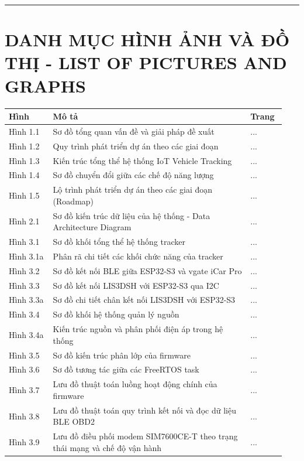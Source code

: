 \documentclass[13pt,a4paper]{extarticle}
\newcounter{none} %
\newcommand{\thesislongtableorignewline}{}
\let\thesislongtableorignewline\\
\renewcommand{\\}{\thesislongtableorignewline\hline}%
\let\\\thesislongtableorignewline
\newcommand{\majorheading}[1]{\clearpage\section*{#1}}
\begin{document}
\begin{center}\rule{0.5\linewidth}{0.5pt}\end{center}

\majorheading{DANH MỤC HÌNH ẢNH VÀ ĐỒ THỊ - LIST OF PICTURES AND GRAPHS}\label{danh-mux1ee5c-huxecnh-ux1ea3nh-vuxe0-ux111ux1ed3-thux1ecb---list-of-pictures-and-graphs}

{\def\LTcaptype{none} %
\begin{longtable}{|C{0.15\linewidth}|L{0.67\linewidth}|C{0.12\linewidth}|}
\hline \textbf{} \textbf{Hình} & \textbf{Mô tả} & \textbf{Trang} \\
\hline
\endhead
\hline
\endlastfoot
Hình 1.1 & Sơ đồ tổng quan vấn đề và giải pháp đề xuất & ... \\
Hình 1.2 & Quy trình phát triển dự án theo các giai đoạn & ... \\
Hình 1.3 & Kiến trúc tổng thể hệ thống IoT Vehicle Tracking & ... \\
Hình 1.4 & Sơ đồ chuyển đổi giữa các chế độ năng lượng & ... \\
Hình 1.5 & Lộ trình phát triển dự án theo các giai đoạn (Roadmap) &
... \\
Hình 2.1 & Sơ đồ kiến trúc dữ liệu của hệ thống - Data Architecture
Diagram & ... \\
Hình 3.1 & Sơ đồ khối tổng thể hệ thống tracker & ... \\
Hình 3.1a & Phân rã chi tiết các khối chức năng của tracker & ... \\
Hình 3.2 & Sơ đồ kết nối BLE giữa ESP32-S3 và vgate iCar Pro & ... \\
Hình 3.3 & Sơ đồ kết nối LIS3DSH với ESP32-S3 qua I2C & ... \\
Hình 3.3a & Sơ đồ chi tiết chân kết nối LIS3DSH với ESP32-S3 & ... \\
Hình 3.4 & Sơ đồ khối hệ thống quản lý nguồn & ... \\
Hình 3.4a & Kiến trúc nguồn và phân phối điện áp trong hệ thống & ... \\
Hình 3.5 & Sơ đồ kiến trúc phân lớp của firmware & ... \\
Hình 3.6 & Sơ đồ tương tác giữa các FreeRTOS task & ... \\
Hình 3.7 & Lưu đồ thuật toán luồng hoạt động chính của firmware & ... \\
Hình 3.8 & Lưu đồ thuật toán quy trình kết nối và đọc dữ liệu BLE OBD2 &
... \\
Hình 3.9 & Lưu đồ điều phối modem SIM7600CE-T theo trạng thái mạng và
chế độ vận hành & ... \\

\end{longtable}}
\end{document}
